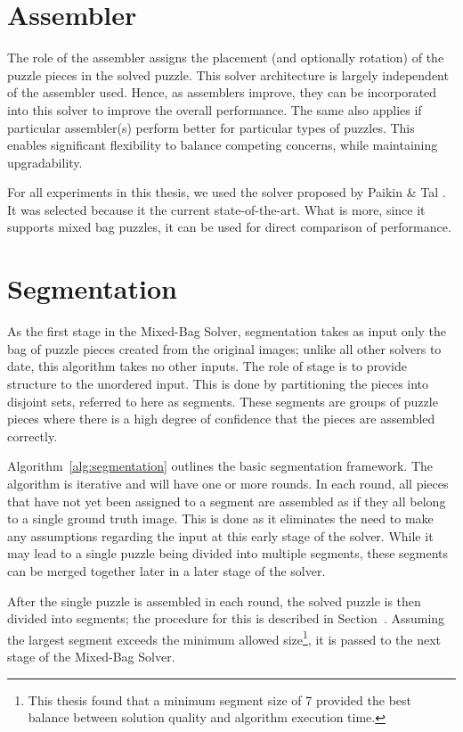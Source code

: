 \section{Assembler}\label{sec:SolverAssembler}

The role of the assembler assigns the placement (and optionally rotation) of the puzzle pieces in the solved puzzle.  This solver architecture is largely independent of the assembler used.  Hence, as assemblers improve, they can be incorporated into this solver to improve the overall performance.  The same also applies if particular assembler(s) perform better for particular types of puzzles.  This enables significant flexibility to balance competing concerns, while maintaining upgradability.

For all experiments in this thesis, we used the solver proposed by Paikin \& Tal \cite{paikin2015}.  It was selected because it the current state-of-the-art.  What is more, since it supports mixed bag puzzles, it can be used for direct comparison of performance.

\section{Segmentation}\label{sec:Segmentation}

As the first stage in the Mixed-Bag Solver, segmentation takes as input only the bag of puzzle pieces created from the original images; unlike all other solvers to date, this algorithm takes no other inputs.  The role of stage is to provide structure to the unordered input.  This is done by partitioning the pieces into disjoint sets, referred to here as segments.  These segments are groups of puzzle pieces where there is a high degree of confidence that the pieces are assembled correctly.

Algorithm~\ref{alg:segmentation} outlines the basic segmentation framework.  The algorithm is iterative and will have one or more rounds.  In each round, all pieces that have not yet been assigned to a segment are assembled as if they all belong to a single ground truth image.  This is done as it eliminates the need to make any assumptions regarding the input at this early stage of the solver.  While it may lead to a single puzzle being divided into multiple segments, these segments can be merged together later in a later stage of the solver.

After the single puzzle is assembled in each round, the solved puzzle is then divided into segments; the procedure for this is described in Section~\label{sec:segmentPuzzle}.  Assuming the largest segment exceeds the minimum allowed size\footnote{This thesis found that a minimum segment size of 7 provided the best balance between solution quality and algorithm execution time.}, it is passed to the next stage of the Mixed-Bag Solver.  

